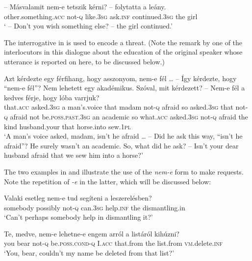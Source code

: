 \documentclass[output=paper,colorlinks,citecolor=brown]{langscibook}
\begin{document}
	\ea\label{ex:tetszik}
	\gll – Másvalamit nem-e tetszik kérni? – folytatta a leány.\\
	{} other.something.\textsc{acc} not-\textsc{q} like.\textsc{3sg} ask.\textsc{inf} {} continued.\textsc{3sg} the girl\\
	\glt ` – Don't you wish something else? – the girl continued.'
	\z
	
	\noindent The  interrogative in  is used to encode a threat. (Note the remark by one of the interlocutors in this dialogue about the education of the original speaker whose utterance is reported on here, to be discussed below.)
	
	\ea\label{ex:fel}
	\gll Azt kérdezte egy férfihang, hogy asszonyom, nem-e fél \dots{}  \nobreakdash--{ }Így kérdezte, hogy ``nem-e fél''? Nem lehetett egy akadémikus. Szóval, mit kérdezett? – Nem-e fél a kedves férje, hogy lóba varrjuk? \\
	that.\textsc{acc} asked.\textsc{3sg} a man's.voice that madam not\textsc{-q} afraid {} \hspace{0.3cm}so asked.\textsc{3sg} that \hspace{0.15cm}not\textsc{-q} afraid not be.\textsc{poss.past.3sg} an academic so what.\textsc{acc} asked.\textsc{3sg} {} not\textsc{-q} afraid the kind husband.your that horse.into sew.\textsc{1pl}\\ \jambox*{[HNC]}
	\glt `A man's voice asked, madam, isn't he afraid \dots { } -- Did he ask this way, ``isn't he afraid''? He surely wasn't an academic. So, what did he ask? \nobreakdash--{ }Isn't your dear husband afraid that we sew him into a horse?'
	\z
	
	
	The two examples in  and  illustrate the use of the \textit{nem-e} form to make requests. Note the repetition of \textit{-e} in the latter, which will be discussed below:
	
	\ea\label{ex:leszerel}
	\gll Valaki esetleg nem-e tud segíteni a leszerelésben? \\
	somebody possibly not\textsc{-q} can.\textsc{3sg} help.\textsc{inf} the dismantling.in\\ \jambox*{[HNC]}
	\glt `Can't perhaps somebody help in dismantling it?'
	\z
	
	\ea\label{ex:medve}
	\gll Te, medve, nem-e lehetne-e engem arról a listáról kihúzni?\\
	you bear not-\textsc{q} be.\textsc{poss.cond-q} I.\textsc{acc} that.from the list.from \textsc{vm}.delete.\textsc{inf}\\ \jambox*{[HNC]}
	\glt `You, bear, couldn't my name be deleted from that list?'
	\z
	
\end{document}

